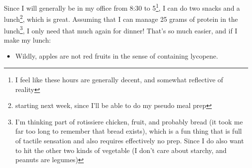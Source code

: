 \documentclass[12pt]{article}[titlepage]
\renewcommand{\,}{\textsuperscript{,}}
\begin{document}
Since I will generally be in my office from 8:30 to 5\footnote{I feel like these hours are generally decent, and somewhat reflective of reality}, I can do two snacks and a lunch\footnote{starting next week, since I'll be able to do my pseudo meal prep}, which is great.  
Assuming that I can manage 25 grams of protein in the lunch\footnote{I'm thinking part of rotissiere chicken, fruit, and probably bread (it took me far too long to remember that bread exists), which is a fun thing that is full of tactile sensation and also requires effectively no prep. Since I do also want to hit the other two kinds of vegetable (I don't care about starchy, and peanuts are legumes)}, I only need that much again for dinner!  
That's so much easier, and if I make my lunch:

\begin{itemize}  
\item Wildly, apples are not red fruits in the sense of containing lycopene.  
\end{itemize}
\end{document}
